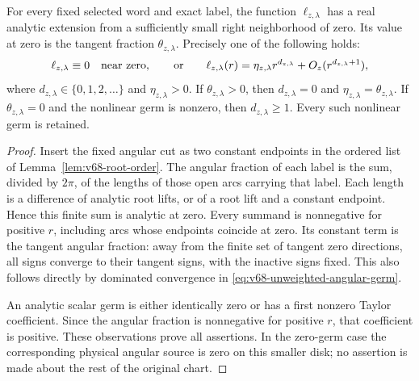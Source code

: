 \begin{theorem}
\label{thm:v68-angular-germ-classification}
For every fixed selected word and exact label, the function
$\ell_{z,\lambda}$ has a real analytic extension from a sufficiently
small right neighborhood of zero. Its value at zero is the tangent
fraction $\theta_{z,\lambda}$. Precisely one of the following holds:
\begin{equation}\label{eq:v68-germ-alternatives}
 \ell_{z,\lambda}\equiv0\quad\hbox{near zero},\qquad\hbox{or}\qquad
 \ell_{z,\lambda}(r)=\eta_{z,\lambda}r^{d_{z,\lambda}}
                              +O_z(r^{d_{z,\lambda}+1}),
\end{equation}
where $d_{z,\lambda}\in\{0,1,2,\ldots\}$ and
$\eta_{z,\lambda}>0$. If $\theta_{z,\lambda}>0$, then
$d_{z,\lambda}=0$ and $\eta_{z,\lambda}=\theta_{z,\lambda}$.
If $\theta_{z,\lambda}=0$ and the nonlinear germ is nonzero, then
$d_{z,\lambda}\ge1$. Every such nonlinear germ is retained.
\end{theorem}
\begin{proof}
Insert the fixed angular cut as two constant endpoints in the ordered
list of Lemma~\ref{lem:v68-root-order}. The angular fraction of each
label is the sum, divided by $2\pi$, of the lengths of those open
arcs carrying that label. Each length is a difference of analytic
root lifts, or of a root lift and a constant endpoint. Hence this
finite sum is analytic at zero. Every summand is nonnegative for
positive $r$, including arcs whose endpoints coincide at zero. Its
constant term is the tangent angular fraction: away from the finite
set of tangent zero directions, all signs converge to their tangent
signs, with the inactive signs fixed. This also follows directly by
dominated convergence in \eqref{eq:v68-unweighted-angular-germ}.

An analytic scalar germ is either identically zero or has a first
nonzero Taylor coefficient. Since the angular fraction is nonnegative
for positive $r$, that coefficient is positive. These observations
prove all assertions. In the zero-germ case the corresponding physical
angular source is zero on this smaller disk; no assertion is made
about the rest of the original chart.
\end{proof}

